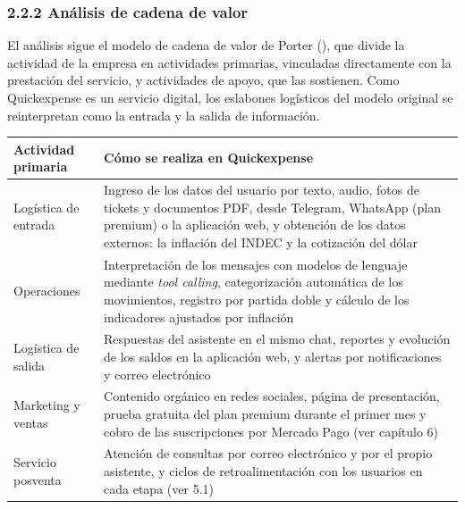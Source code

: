 \subsubsection*{2.2.2 Análisis de cadena de
valor}\label{anuxe1lisis-de-cadena-de-valor}

El análisis sigue el modelo de cadena de valor de Porter
(), que divide la actividad de la empresa
en actividades primarias, vinculadas directamente con la prestación del
servicio, y actividades de apoyo, que las sostienen. Como Quickexpense
es un servicio digital, los eslabones logísticos del modelo original se
reinterpretan como la entrada y la salida de información.

{\def\LTcaptype{none} %
\begin{longtable}[]{@{}
  >{\raggedright\arraybackslash}p{}
  >{\raggedright\arraybackslash}p{}@{}}
\toprule\noalign{}
\begin{minipage}[b]{\linewidth}\raggedright
Actividad primaria
\end{minipage} & \begin{minipage}[b]{\linewidth}\raggedright
Cómo se realiza en Quickexpense
\end{minipage} \\
\midrule\noalign{}
\endhead
\bottomrule\noalign{}
\endlastfoot
Logística de entrada & Ingreso de los datos del usuario por texto,
audio, fotos de tickets y documentos PDF, desde Telegram, WhatsApp (plan
premium) o la aplicación web, y obtención de los datos externos: la
inflación del INDEC y la cotización del dólar \\
Operaciones & Interpretación de los mensajes con modelos de lenguaje
mediante \emph{tool calling}, categorización automática de los
movimientos, registro por partida doble y cálculo de los indicadores
ajustados por inflación \\
Logística de salida & Respuestas del asistente en el mismo chat,
reportes y evolución de los saldos en la aplicación web, y alertas por
notificaciones y correo electrónico \\
Marketing y ventas & Contenido orgánico en redes sociales, página de
presentación, prueba gratuita del plan premium durante el primer mes y
cobro de las suscripciones por Mercado Pago (ver capítulo 6) \\
Servicio posventa & Atención de consultas por correo electrónico y por
el propio asistente, y ciclos de retroalimentación con los usuarios en
cada etapa (ver 5.1) \\
\end{longtable}
}

